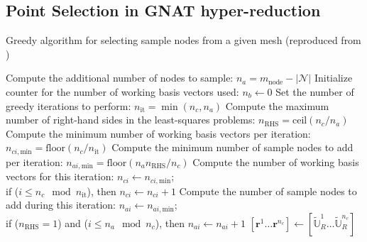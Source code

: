 \documentclass[11pt]{article}
\renewcommand{\vec}[1]{\mathbf{#1}}
\begin{document}
            \subsection{Point Selection in GNAT hyper-reduction}
            \begin{algorithm}[H]
                \caption{Greedy algorithm for selecting sample nodes from a given  mesh (reproduced from \cite{carlberg2013gnat})}
                \label{greedy}
                \begin{algorithmic}[1]
                    \STATE Compute the additional number of nodes to sample: $n_a = m_{\mathrm{node}} - |\mathcal{N}|$
                    \STATE Initialize counter for the number of working basis vectors used: $n_b \leftarrow 0$
                    \STATE Set the number of greedy iterations to perform: $n_{\mathrm{it}} = \min(n_c, n_a)$
                    \STATE Compute the maximum number of right-hand sides in the least-squares problems: $n_{\mathrm{RHS}} = \mathrm{ceil}(n_c / n_a)$
                    \STATE Compute the minimum number of working basis vectors per iteration: $n_{ci,\mathrm{min}} = \mathrm{floor}(n_c / n_{\mathrm{it}})$
                    \STATE Compute the minimum number of sample nodes to add per iteration: $n_{ai,\mathrm{min}} = \mathrm{floor}(n_a n_{\mathrm{RHS}} / n_c)$
                    \STATE Compute the number of working basis vectors for this iteration: $n_{ci} \leftarrow n_{ci,\mathrm{min}}$;
                    \\ if ($i \leq n_c \mod n_{\mathrm{it}}$), then $n_{ci} \leftarrow n_{ci} + 1$
                    \STATE Compute the number of sample nodes to add during this iteration: $n_{ai} \leftarrow n_{ai,\mathrm{min}}$;
                    \\ if ($n_{\mathrm{RHS}} = 1$) and ($i \leq n_a \mod n_c$), then $n_{ai} \leftarrow n_{ai} + 1$
                    \STATE $[\vec{r}^1 \ldots \vec{r}^{n_c}] \gets [\widetilde{\mathbb{U}}_R^1 \ldots \widetilde{\mathbb{U}}_R^{n_c}]$

\end{algorithmic}
\end{algorithm}
\end{document}
